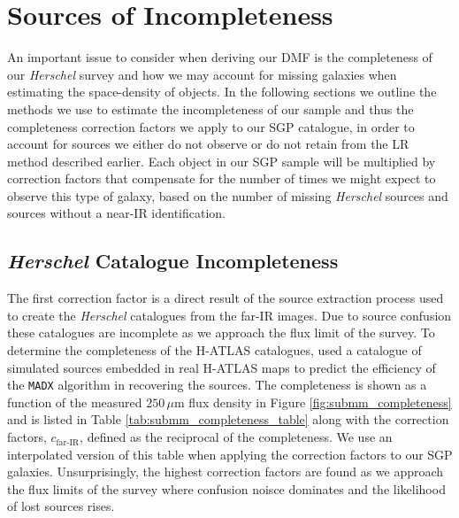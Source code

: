 \section{Sources of Incompleteness}

An important issue to consider when deriving our DMF is the completeness of our \textit{Herschel} survey and how we may account for missing galaxies when estimating the space-density of objects. In the following sections we outline the methods we use to estimate the incompleteness of our sample and thus the completeness correction factors we apply to our SGP catalogue, in order to account for sources we either do not observe or do not retain from the LR method described earlier. Each object in our SGP sample will be multiplied by correction factors that compensate for the number of times we might expect to observe this type of galaxy, based on the number of missing \textit{Herschel} sources and sources without a near-IR identification.

\subsection{\textit{Herschel} Catalogue Incompleteness}

The first correction factor is a direct result of the source extraction process used to create the \textit{Herschel} catalogues from the far-IR images. Due to source confusion these catalogues are incomplete as we approach the flux limit of the survey. To determine the completeness of the H-ATLAS catalogues, \citealt{Valiante_2016} used a catalogue of simulated sources embedded in real H-ATLAS maps to predict the efficiency of the \texttt{MADX} algorithm in recovering the sources. The completeness is shown as a function of the measured $250\,\mu$m flux density in Figure \ref{fig:submm_completeness} and is listed in Table \ref{tab:submm_completeness_table} along with the correction factors, $c_{\textrm{far-IR}}$, defined as the reciprocal of the completeness. We use an interpolated version of this table when applying the correction factors to our SGP galaxies. Unsurprisingly, the highest correction factors are found as we approach the flux limits of the survey where confusion noisce dominates and the likelihood of lost sources rises.

